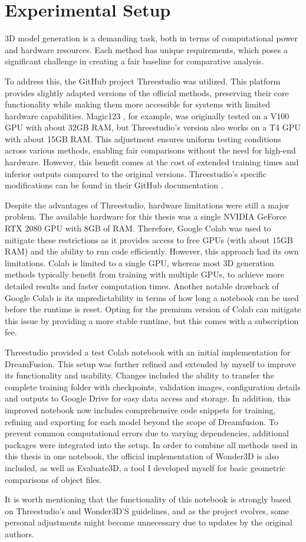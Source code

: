 \section{Experimental Setup}\label{Setup}

3D model generation is a demanding task, both in terms of computational power and hardware resources. Each method has unique requirements, which poses a significant challenge in creating a fair baseline for comparative analysis.

To address this, the GitHub project Threestudio \citep{threestudio2023} was utilized. This platform provides slightly adapted versions of the official methods, preserving their core functionality while making them more accessible for systems with limited hardware capabilities. Magic123 \citep{qian2023magic123}, for example, was originally tested on a V100 GPU with about 32GB RAM, but Threestudio's version also works on a T4 GPU with about 15GB RAM\@. This adjustment ensures uniform testing conditions across various methods, enabling fair comparisons without the need for high-end hardware. However, this benefit comes at the cost of extended training times and inferior outputs compared to the original versions. Threestudio's specific modifications can be found in their GitHub documentation \citep{threestudio2023}.

Despite the advantages of Threestudio, hardware limitations were still a major problem. The available hardware for this thesis was a single NVIDIA GeForce RTX 2080 GPU with 8GB of RAM\@. Therefore, Google Colab \citep{googlecolab} was used to mitigate these restrictions as it provides access to free GPUs (with about 15GB RAM) and the ability to run code efficiently. However, this approach had its own limitations. Colab is limited to a single GPU, whereas most 3D generation methods typically benefit from training with multiple GPUs, to achieve more detailed results and faster computation times. Another notable drawback of Google Colab is its unpredictability in terms of how long a notebook can be used before the runtime is reset. Opting for the premium version of Colab can mitigate this issue by providing a more stable runtime, but this comes with a subscription fee.

Threestudio provided a test Colab notebook with an initial implementation for DreamFusion. This setup was further refined and extended by myself to improve its functionality and usability. Changes included the ability to transfer the complete training folder with checkpoints, validation images, configuration details and outputs to Google Drive for easy data access and storage. In addition, this improved notebook now includes comprehensive code snippets for training, refining and exporting for each model beyond the scope of Dreamfusion. To prevent common computational errors due to varying dependencies, additional packages were integrated into the setup. In order to combine all methods used in this thesis in one notebook, the official implementation of Wonder3D \citep{long2023wonder3d} is also included, as well as Evaluate3D, a tool I developed myself for basic geometric comparisons of object files.

It is worth mentioning that the functionality of this notebook is strongly based on Threestudio's and Wonder3D'S guidelines, and as the project evolves, some personal adjustments might become unnecessary due to updates by the original authors.